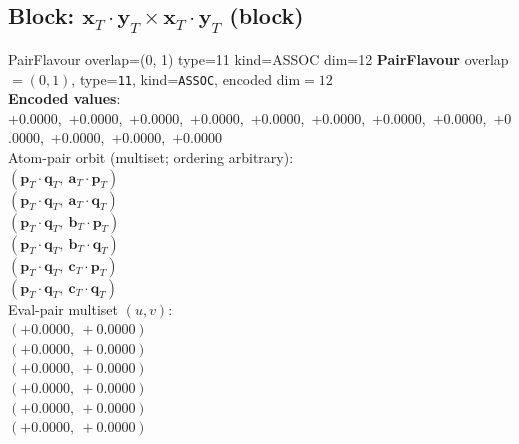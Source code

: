 \documentclass[a4paper,11pt]{article}
\newcommand{\fpbeomcfokjooi}[2]{\mathbf{#1}_T \cdot \mathbf{#2}_T}
\begin{document}
\subsection{Block: $\fpbeomcfokjooi{x}{y} \times \fpbeomcfokjooi{x}{y}$  (block)}
    PairFlavour  overlap=(0, 1)  type=11  kind=ASSOC  dim=12
\textbf{PairFlavour} overlap$=(0, 1)$, type=\texttt{11}, kind=\texttt{ASSOC}, encoded dim$=12$\\
\textbf{      Encoded values}: +0.0000,\ +0.0000,\ +0.0000,\ +0.0000,\ +0.0000,\ +0.0000,\ +0.0000,\ +0.0000,\ +0.0000,\ +0.0000,\ +0.0000,\ +0.0000\\
\quad Atom-pair orbit (multiset; ordering arbitrary):\\
$(\fpbeomcfokjooi{p}{q},\ \fpbeomcfokjooi{a}{p})$\\
$(\fpbeomcfokjooi{p}{q},\ \fpbeomcfokjooi{a}{q})$\\
$(\fpbeomcfokjooi{p}{q},\ \fpbeomcfokjooi{b}{p})$\\
$(\fpbeomcfokjooi{p}{q},\ \fpbeomcfokjooi{b}{q})$\\
$(\fpbeomcfokjooi{p}{q},\ \fpbeomcfokjooi{c}{p})$\\
$(\fpbeomcfokjooi{p}{q},\ \fpbeomcfokjooi{c}{q})$\\
\quad Eval-pair multiset $(u, v)$:\\
$(+0.0000,\ +0.0000)$\\
$(+0.0000,\ +0.0000)$\\
$(+0.0000,\ +0.0000)$\\
$(+0.0000,\ +0.0000)$\\
$(+0.0000,\ +0.0000)$\\
$(+0.0000,\ +0.0000)$\\
\end{document}
